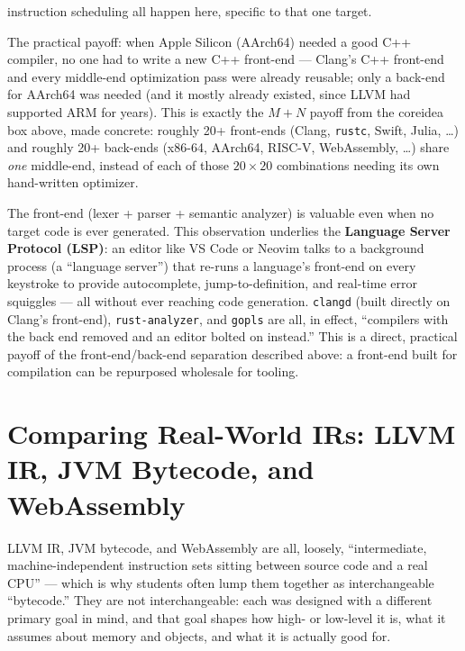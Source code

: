 \documentclass[full-course-notes.tex]{subfiles}
\begin{document}
\begin{enrichment}
\begin{itemize}
  instruction scheduling all happen here, specific to that one target.
\end{itemize}
The practical payoff: when Apple Silicon (AArch64) needed a good C++ compiler, no one had to
write a new C++ front-end --- Clang's C++ front-end and every middle-end optimization pass were
already reusable; only a back-end for AArch64 was needed (and it mostly already existed, since
LLVM had supported ARM for years). This is exactly the $M+N$ payoff from the coreidea box above,
made concrete: roughly 20+ front-ends (Clang, \texttt{rustc}, Swift, Julia, \dots) and roughly
20+ back-ends (x86-64, AArch64, RISC-V, WebAssembly, \dots) share \emph{one} middle-end, instead
of each of those $20 \times 20$ combinations needing its own hand-written optimizer.
\end{enrichment}

\begin{enrichment}
The front-end (lexer + parser + semantic analyzer) is valuable even when no target code is ever
generated. This observation underlies the \textbf{Language Server Protocol (LSP)}: an editor
like VS Code or Neovim talks to a background process (a ``language server'') that re-runs a
language's front-end on every keystroke to provide autocomplete, jump-to-definition, and
real-time error squiggles --- all without ever reaching code generation. \texttt{clangd} (built
directly on Clang's front-end), \texttt{rust-analyzer}, and \texttt{gopls} are all, in effect,
``compilers with the back end removed and an editor bolted on instead.'' This is a direct,
practical payoff of the front-end/back-end separation described above: a front-end built for
compilation can be repurposed wholesale for tooling.
\end{enrichment}

\section{Comparing Real-World IRs: LLVM IR, JVM Bytecode, and WebAssembly}
\label{sec:l2-ir-comparison}

\beyonddb LLVM IR, JVM bytecode, and WebAssembly are all, loosely, ``intermediate,
machine-independent instruction sets sitting between source code and a real CPU'' --- which is
why students often lump them together as interchangeable ``bytecode.'' They are not
interchangeable: each was designed with a different primary goal in mind, and that goal shapes
how high- or low-level it is, what it assumes about memory and objects, and what it is actually
good for.
\end{document}
